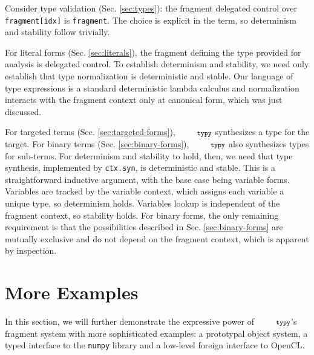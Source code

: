 \documentclass[10pt]{sigplanconf}
\newcommand{\typy}{\texttt{\footnotesize typy}}
\newcommand{\lip}[1]{\lstinline[language=Python,basicstyle=\ttfamily\footnotesize,morekeywords={with},deletendkeywords={tuple,buffer,map}]{#1}}
\newcommand{\li}[1]{\lip{#1}}
\begin{document}
Consider type validation (Sec. \ref{sec:types}): the fragment delegated control over \li{fragment[idx]} is \li{fragment}. The choice is explicit in the term, so determinism and stability follow trivially.

For literal forms (Sec. \ref{sec:literals}), the fragment defining the type provided for analysis is delegated control. To establish determinism and stability, we need only establish that type normalization is deterministic and stable. Our language of type expressions is a standard deterministic lambda calculus \cite{DBLP:conf/lfmtp/Crary09} and normalization interacts with the fragment context only at canonical form, which was just discussed.


For targeted terms (Sec. \ref{sec:targeted-forms}), $\typy$ synthesizes a type for the target. For binary terms (Sec. \ref{sec:binary-forms}), $\typy$ also synthesizes types for sub-terms. For determinism and stability to hold, then, we need that type synthesis, implemented by \li{ctx.syn}, is deterministic and stable. This is a straightforward inductive argument, with the base case being variable forms. Variables are tracked by the variable context, which assigns each variable a unique type, so determinism holds. Variables lookup is independent of the fragment context, so stability holds. For binary forms, the only remaining requirement is that the possibilities described in Sec. \ref{sec:binary-forms} are mutually exclusive and do not depend on the fragment context, which is apparent by inspection.



\section{More Examples}\label{sec:more-examples}
In this section, we will further demonstrate the expressive power of $\typy$'s fragment system with more sophisticated examples: a prototypal object system, a typed interface to the \li{numpy} library and a low-level foreign interface to OpenCL.
\end{document}
